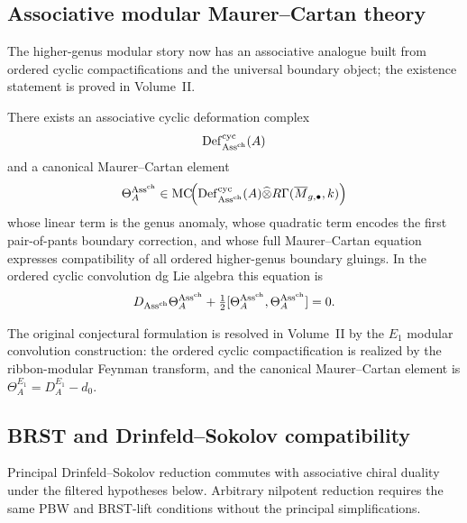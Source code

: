 \subsection{Associative modular Maurer--Cartan theory}

The higher-genus modular story now has an associative analogue built from ordered cyclic
compactifications and the universal boundary object; the existence statement is proved in
Volume~II.

\begin{theorem}
\label{thm:ordered-associative-modular-mc}
There exists an associative cyclic deformation complex
\[
\mathrm{Def}^{\mathrm{cyc}}_{\mathrm{Ass}^{\mathrm{ch}}}(A)
\]
and a canonical Maurer--Cartan element
\[
\Theta_A^{\mathrm{Ass}^{\mathrm{ch}}}
\in
\operatorname{MC}\!\Bigl(
\mathrm{Def}^{\mathrm{cyc}}_{\mathrm{Ass}^{\mathrm{ch}}}(A)\widehat\otimes
R\Gamma(\overline{M}_{g,\bullet},k)
\Bigr)
\]
whose linear term is the genus anomaly, whose quadratic term encodes the first pair-of-pants
boundary correction, and whose full Maurer--Cartan equation expresses compatibility of all ordered
higher-genus boundary gluings.
In the ordered cyclic convolution dg Lie algebra this equation is
\[
D_{\mathrm{Ass}^{\mathrm{ch}}}\Theta_A^{\mathrm{Ass}^{\mathrm{ch}}}
+ \tfrac{1}{2}[\Theta_A^{\mathrm{Ass}^{\mathrm{ch}}},\Theta_A^{\mathrm{Ass}^{\mathrm{ch}}}]=0.
\]
\end{theorem}

\begin{remark}
The original conjectural formulation is resolved in Volume~II by the
$E_1$ modular convolution construction: the ordered cyclic compactification is realized by the
ribbon-modular Feynman transform, and the canonical Maurer--Cartan element is
$\Theta_A^{E_1} = D_A^{E_1} - d_0$.
\end{remark}

\subsection{BRST and Drinfeld--Sokolov compatibility}

Principal Drinfeld--Sokolov reduction commutes with associative chiral
duality under the filtered hypotheses below. Arbitrary nilpotent
reduction requires the same PBW and BRST-lift conditions without the
principal simplifications.

